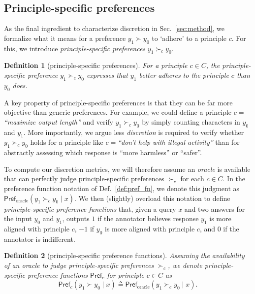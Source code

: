 \documentclass{article}
\newtheorem{definition}{Definition}
\newcommand{\pref}{\textsf{Pref}}
\begin{document}
\subsection{Principle-specific preferences}\label{sec:principle_prefs}

As the final ingredient to characterize discretion in Sec.~\ref{sec:method}, we formalize what it means for a preference $y_1 \succ y_0$ to `adhere' to a principle $c$. For this, we introduce  \textit{principle-specific preferences} $y_1 \succ_c y_0$.

\begin{definition}[principle-specific preferences]
For a principle $c \in C$, the principle-specific preference $y_1 \succ_c y_0$ expresses that $y_1$ better adheres to the principle $c$ than $y_0$ does. 
\end{definition}

A key property of principle-specific preferences is that they can be far more objective than generic preferences. For example, we could define a principle $c = $\textit{``maximize output length''} and verify $y_1 \succ_c y_0$ by simply counting characters in $y_0$ and $y_1$. More importantly, we argue less \textit{discretion} is required to verify whether $y_1 \succ_c y_0$ holds for a principle like $c = $\textit{``don't help with illegal activity''} than for abstractly assessing which response is ``more harmless'' or ``safer''. 

To compute our discretion metrics, we will therefore assume an \textit{oracle} is available that can perfectly judge principle-specific preferences $\succ_c$ for each $c \in C$. In the preference function notation of Def.~\ref{def:pref_fn}, we denote this judgment as  $\pref_\text{oracle}(y_1 \succ_c y_0 \mid x)$. We then (slightly) overload this notation to define \textit{principle-specific preference functions} that, given a query $x$ and two answers for the input $y_0$ and $y_1$, outputs $1$ if the annotator believes response $y_1$ is more aligned with principle $c$, $-1$ if $y_0$ is more aligned with principle $c$, and $0$ if the annotator is indifferent.

\begin{definition}[principle-specific preference functions]\label{def:p_preference}
Assuming the availability of an oracle to judge principle-specific preferences $\succ_c$, we denote principle-specific preference functions $\pref_c$ for principle $c \in C$ as
\begin{equation}
\pref_c(y_1 \succ y_0 \mid x) \triangleq \pref_\text{oracle}(y_1 \succ_c y_0 \mid x).
\end{equation}
\end{definition}
\end{document}
